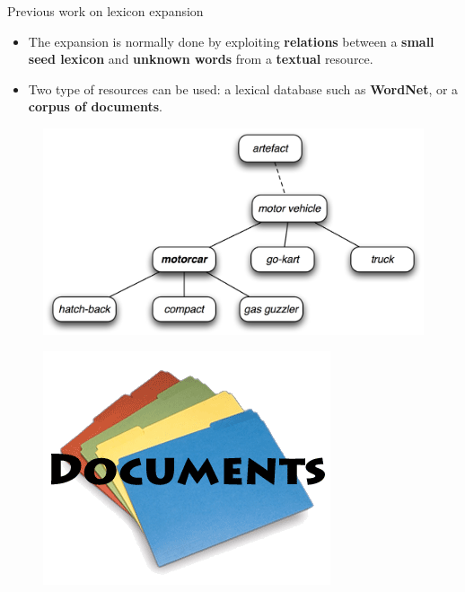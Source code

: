 \documentclass[handout]{beamer}
\begin{document}
\begin{frame}{Previous work on lexicon expansion}
\begin{scriptsize}

\begin{itemize} 
 \item The expansion is normally done by exploiting \textbf{relations} between a \textbf{small seed lexicon} and \textbf{unknown words} from a \textbf{textual} resource.
\item  Two type of resources can be used: a lexical database such as \textbf{WordNet}, or a \textbf{corpus of documents}. 
\end{itemize}



\begin{figure}[h!]
	\centering
	\includegraphics[scale=0.3]{pics/wordnet.png}
\end{figure}

\begin{figure}[h!]
	\centering
	\includegraphics[scale=0.2]{pics/documents.jpg}
\end{figure}





\end{scriptsize}
\end{frame}
\end{document}
